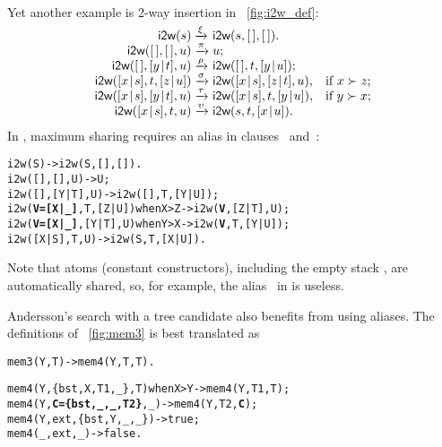 \noindent Yet another example is 2-way insertion in
\fig~\vref{fig:i2w_def}:
\begin{equation*}
\begin{array}{@{}r@{\;}l@{\;}ll@{}}
\fun{i2w}(s)         & \xrightarrow{\smash{\xi}}
                     & \fun{i2w}(s,\el,\el).\\
\fun{i2w}(\el,\el,u) & \xrightarrow{\smash{\pi}} 
                     & u;\\
\fun{i2w}(\el,\cons{y}{t},u)
                     & \xrightarrow{\smash{\rho}}
                     & \fun{i2w}(\el,t,\cons{y}{u});\\
\fun{i2w}(\cons{x}{s},t,\cons{z}{u})
                     & \xrightarrow{\smash{\sigma}}
                     & \fun{i2w}(\cons{x}{s},\cons{z}{t},u),
                     & \text{if \(x \succ z\)};\\
\fun{i2w}(\cons{x}{s},\cons{y}{t},u)
                     & \xrightarrow{\smash{\tau}}
                     & \fun{i2w}(\cons{x}{s},t,\cons{y}{u}),
                     & \text{if \(y \succ x\)};\\
\fun{i2w}(\cons{x}{s},t,u)
                     & \xrightarrow{\smash{\upsilon}}
                     & \fun{i2w}(s,t,\cons{x}{u}).
\end{array}
\end{equation*}
In \Erlang, maximum sharing requires an alias in clauses
\clause{\sigma}~and~\clause{\tau}:
\begin{alltt}
i2w(S)                              -> i2w(S,[],[]).
i2w(     [],   [],    U)            -> U;
i2w(     [],[Y|T],    U)            -> i2w([],T,[Y|U]);
i2w(\textbf{V=[X|\_]},    T,[Z|U]) when X > Z -> i2w(\textbf{V},[Z|T],U);
i2w(\textbf{V=[X|\_]},[Y|T],    U) when Y > X -> i2w(\textbf{V},T,[Y|U]);
i2w(  [X|S],    T,    U)            -> i2w(S,T,[X|U]).
\end{alltt}
Note that atoms (constant constructors), including the empty stack
\erlcode{[]}, are automatically shared, so, for example, the
alias~ in  is useless.

Andersson's search with a tree candidate also benefits from using
aliases. The definitions of \fig~\vref{fig:mem3} is best translated as
\begin{alltt}
mem3(Y,T) -> mem4(Y,T,T).

mem4(Y,  \{bst,X,T1,_\},        T) when X > Y -> mem4(Y,T1,T);
mem4(Y,\textbf{C=\{bst,\_,\_,T2\}},        \_)            -> mem4(Y,T2,\textbf{C});
mem4(Y,         ext,\{bst,Y,\_,\_\})            -> true;
mem4(\_,           ext,        \_)            -> false.
\end{alltt}


